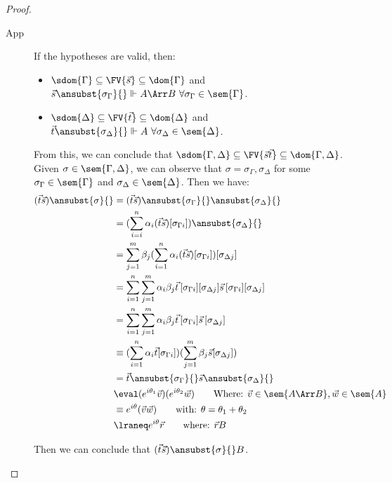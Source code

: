 \begin{proof}
\begin{description}
    \item[App] If the hypotheses are valid, then:
    \begin{itemize}
        \item $\sdom{\Gamma}\subseteq \FV{\vec s}\subseteq \dom{\Gamma}$ and $\vec s \ansubst{\sigma_\Gamma}{}\Vdash A\Arr B\ \forall \sigma_\Gamma\in\sem{\Gamma}$.
        \item $\sdom{\Delta}\subseteq \FV{\vec t}\subseteq \dom{\Delta}$ and $\vec t\ansubst{\sigma_\Delta}{}\Vdash A\ \forall\sigma_\Delta\in\sem{\Delta}$.
    \end{itemize}
    
    From this, we can conclude that $\sdom{\Gamma,\Delta}\subseteq \FV{\vec s \vec t}\subseteq \dom{\Gamma,\Delta}$. Given $\sigma\in\sem{\Gamma,\Delta}$, we can observe that $\sigma=\sigma_\Gamma,\sigma_\Delta$ for some $\sigma_\Gamma\in\sem{\Gamma}$ and $\sigma_\Delta\in\sem{\Delta}$. Then we have:
    \begin{align*}
        (\vec{t}\vec{s})\ansubst{\sigma}{} &= (\vec{t}\vec{s})\ansubst{\sigma_\Gamma}{}\ansubst{\sigma_\Delta}{}\\
        &=(\sum_{i=i}^{n}\alpha_i (\vec{t}\vec{s})[\sigma_{\Gamma i}])\ansubst{\sigma_\Delta}{}\\
        &=\sum_{j=1}^{m} \beta_j (\sum_{i=1}^{n} \alpha_i (\vec{t} \vec{s})[\sigma_{\Gamma i}])[\sigma_{\Delta j}]\\
        &=\sum_{i=1}^{n}\sum_{j=1}^{m} \alpha_i \beta_j \vec{t}\,[\sigma_{\Gamma i}][\sigma_{\Delta j}] \vec{s}\,[\sigma_{\Gamma i}][\sigma_{\Delta j}]\\
        &=\sum_{i=1}^{n}\sum_{j=1}^{m} \alpha_i \beta_j \vec{t}\,[\sigma_{\Gamma i}]\vec{s}\,[\sigma_{\Delta j}]\\
        &\equiv (\sum_{i=1}^{n}\alpha_i\vec{t}[\sigma_{\Gamma i}])(\sum_{j=1}^{m} \beta_j \vec{s}[\sigma_{\Delta j}])\\
        &=\vec{t}\ansubst{\sigma_\Gamma}{} \vec{s}\ansubst{\sigma_\Delta}{}\\
        &\eval (e^{i\theta_{1}} \vec{v}) (e^{i\theta_{2}} \vec{w})\qquad\text{Where: } \vec{v}\in\sem{A\Arr B}, \vec{w}\in\sem{A}\\
        &\equiv e^{i\theta} (\vec{v} \vec{w})\qquad\text{with: }\theta=\theta_1 + \theta_2\\
        &\lraneq e^{i\theta}\vec r\qquad\text{where: } \vec{r}\real B
    \end{align*}
    
    Then we can conclude that $(\vec{t}\vec{s})\ansubst{\sigma}{}\real B$.


\end{description}
\end{proof}
